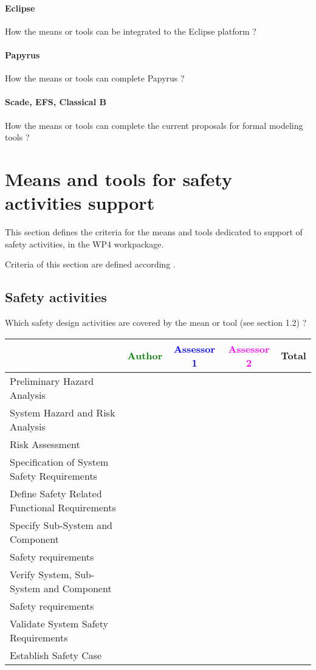 \paragraph{Eclipse}
How the means or tools can be integrated to the Eclipse platform ?

\paragraph{Papyrus}
How the means or tools can complete  Papyrus ?


\paragraph{Scade, EFS, Classical B}
How the means or tools can complete the current proposals for formal modeling tools ?


\section{Means and tools for safety activities support}
\label{sec:safety}


This section defines the criteria for the means and tools dedicated to support of safety activities, in the WP4 workpackage. 

Criteria of this section are defined according \citep{D4.2.a}.

\subsection{Safety activities}

Which safety design activities are covered by the mean or tool (see \citep{D4.2.a} section 1.2) ?

\begin{tabular}{|l | c | c | c | c|}
\hline
& \textcolor{green}{Author} & \textcolor{blue}{Assessor 1} & \textcolor{magenta}{Assessor 2} & Total \\
\hline 
Preliminary Hazard Analysis & & & &  \\
\hline
System Hazard and Risk Analysis & & & & \\
\hline
Risk Assessment & & & & \\
\hline
Specification of System Safety Requirements & & & &  \\
\hline
Define Safety Related Functional Requirements & & & & \\
\hline
Specify Sub-System and Component & & & & \\
Safety requirements & & & & \\
\hline
Verify System, Sub-System and Component & & & &  \\
Safety requirements & & & &  \\
\hline
Validate System Safety Requirements & & & & \\
\hline
Establish Safety Case & & & & \\
\hline
\end{tabular}


